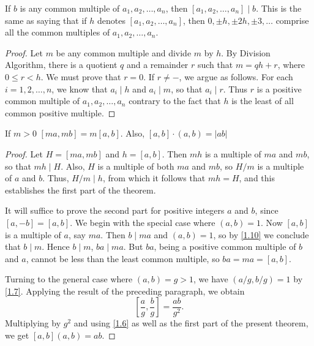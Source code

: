 \documentclass[11pt]{article}
\begin{document}
\begin{theorem}\label{1.12}
    If \(b\) is any common multiple of \(a_1, a_2, \ldots, a_n\), then \([a_1, a_2, \ldots, a_n] \mid b\). This is the same as saying that if \(h\) denotes \([a_1, a_2, \ldots, a_n]\), then \(0, \pm h, \pm 2h, \pm 3, \ldots\) comprise all the common multiples of \(a_1, a_2, \ldots, a_n\).
\end{theorem}
\begin{proof}
    Let \(m\) be any common multiple and divide \(m\) by \(h\). By Division Algorithm, there is a quotient \(q\) and a remainder \(r\) such that \(m = qh + r\), where \(0 \leqslant r < h\). We must prove that \(r = 0\). If \(r \neq -\), we argue as follows. For each \(i = 1, 2, \ldots, n\), we know that \(a_i \mid h\) and \(a_i \mid m\), so that \(a_i \mid r\). Thus \(r\) is a positive common multiple of \(a_1, a_2, \ldots, a_n\) contrary to the fact that \(h\) is the least of all common positive multiple.
\end{proof}

\begin{theorem}\label{1.13}
    If \(m > 0\) \([ma, mb] = m[a, b]\). Also, \([a,b] \cdot (a, b) = |ab|\)
\end{theorem}
\begin{proof}
    Let \( H = [ma, mb] \) and \( h = [a, b] \). Then \( mh \) is a multiple of \( ma \) and \( mb \), so that \( mh \mid H \). Also, \( H \) is a multiple of both \( ma \) and \( mb \), so \( H / m \) is a multiple of \( a \) and \( b \). Thus, \( H / m \mid h \), from which it follows that \( mh = H \), and this establishes the first part of the theorem.

    It will suffice to prove the second part for positive integers \( a \) and \( b
    \), since \( [a, -b] = [a, b] \). We begin with the special case where \( (a,
    b) = 1 \). Now \( [a, b] \) is a multiple of \( a \), say \( ma \). Then \( b
    \mid ma \) and \( (a, b) = 1 \), so by \cref{1.10} we conclude that \(
    b \mid m \). Hence \( b \mid m \), \( ba \mid ma \). But \( ba \), being a
    positive common multiple of \( b \) and \( a \), cannot be less than the least
    common multiple, so \( ba = ma = [a, b] \).

    Turning to the general case where \( (a, b) = g > 1 \), we have \( (a/g, b/g) =
    1 \) by \cref{1.7}. Applying the result of the preceding paragraph, we
    obtain
    \[
        \left[ \frac{a}{g}, \frac{b}{g} \right] = \frac{ab}{g^2}.
    \]
    Multiplying by \( g^2 \) and using \cref{1.6} as well as the first part
    of the present theorem, we get \( [a, b](a, b) = ab \).
\end{proof}
\end{document}
